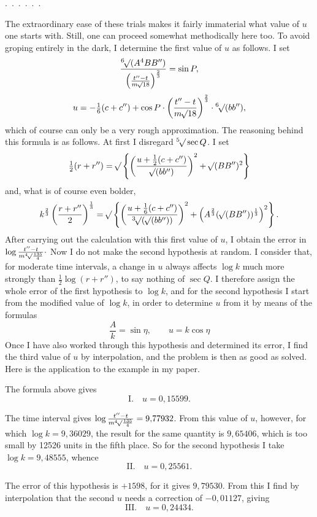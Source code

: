 \noindent\hspace*{\parindent}.\ .\ .\ .\ .\ .\par
The extraordinary ease of these trials makes it fairly immaterial what value of \(u\) one starts with. Still, one can proceed somewhat methodically here too. To avoid groping entirely in the dark, I determine the first value of \(u\) as follows. I set
\[
\frac{\BareRoot[6]{(A^4BB'')}}{\left(\frac{t''-t}{m\BareRoot{18}}\right)^{\frac23}}=\sin P,
\]
\[
u=-\tfrac16(c+c'')+\cos P\cdot\left(\frac{t''-t}{m\BareRoot{18}}\right)^{\frac23}\cdot\BareRoot[6]{(bb'')},
\]
which of course can only be a very rough approximation. The reasoning behind this formula is as follows. At first I disregard \(\BareRoot[5]{\sec Q}\). I set
\[
\tfrac12(r+r'')=\BareRoot{\left\{\left(\frac{u+\frac12(c+c'')}{\BareRoot{(bb'')}}\right)^2+\BareRoot{(BB'')}^2\right\}}
\]
and, what is of course even bolder,
\[
k^{\frac23}\left(\frac{r+r''}2\right)^{\frac13}=\BareRoot{\left\{\left(\frac{u+\frac16(c+c'')}{\BareRoot[3]{(\BareRoot{(bb'')})}}\right)^2+\left(A^{\frac23}(\BareRoot{(BB'')})^{\frac13}\right)^2\right\}}.
\]
After carrying out the calculation with this first value of \(u\), I obtain the error in \(\log\frac{t''-t}{m\BareRoot[4]{\frac{135}4}}\mathpunct{\cdot}\) Now I do not make the second hypothesis at random. I consider that, for moderate time intervals, a change in \(u\) always affects \(\log k\) much more strongly than \(\tfrac12\log(r+r'')\), to say nothing of \(\sec Q\). I therefore assign the whole error of the first hypothesis to \(\log k\), and for the second hypothesis I start from the modified value of \(\log k\), in order to determine \(u\) from it by means of the formulas
\[
\frac Ak=\sin\eta,\qquad u=k\cos\eta
\]
Once I have also worked through this hypothesis and determined its error, I find the third value of \(u\) by interpolation, and the problem is then as good as solved. Here is the application to the example in my paper.

The formula above gives
\[
\mathrm{I.}\quad u=0{,}15599.
\]

The time interval gives \(\log\frac{t''-t}{m\BareRoot[4]{\frac{135}4}}=9{,}77932\). From this value of \(u\), however, for which \(\log k=9{,}36029\), the result for the same quantity is \(9{,}65406\), which is too small by 12526 units in the fifth place. So for the second hypothesis I take \(\log k=9{,}48555\), whence
\[
\mathrm{II.}\quad u=0{,}25561.
\]

The error of this hypothesis is \(+1598\), for it gives \(9{,}79530\). From this I find by interpolation that the second \(u\) needs a correction of \(-0{,}01127\), giving
\[
\mathrm{III.}\quad u=0{,}24434.
\]

